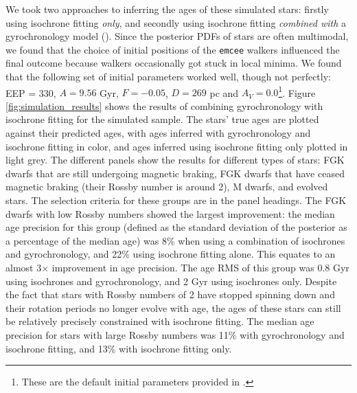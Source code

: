 We took two approaches to inferring the ages of these simulated stars:
firstly using isochrone fitting {\it only}, and secondly using isochrone
fitting {\it combined with} a gyrochronology model (\sd).
Since the posterior PDFs of stars are often multimodal, we found that the
choice of initial positions of the {\tt emcee} walkers influenced the final
outcome because walkers occasionally got stuck in local minima.
We found that the following set of initial parameters worked well, though not
perfectly: EEP = 330, $A = 9.56$ Gyr, $F = -0.05$, $D = 269$ pc and $A_V =
0.0$\footnote{These are the default initial parameters provided in \sd.}.
Figure \ref{fig:simulation_results} shows the results of combining
gyrochronology with isochrone fitting for the simulated sample.
The stars' true ages are plotted against their predicted ages, with ages
inferred with gyrochronology and isochrone fitting
in color, and ages inferred using isochrone fitting only plotted in light
grey.
The different panels show the results for different types of stars: FGK
dwarfs that are still undergoing magnetic braking, FGK dwarfs that have ceased
magnetic braking (their Rossby number is around 2), M dwarfs, and evolved
stars.
The selection criteria for these groups are in the panel headings.
The FGK dwarfs with low Rossby numbers showed the largest improvement: the
median age precision for this group (defined as the standard deviation of the
posterior as a percentage of the median age) was 8\% when using a combination
of isochrones and gyrochronology, and 22\% using isochrone fitting alone.
This equates to an almost 3$\times$ improvement in age precision.
The age RMS of this group was 0.8 Gyr using isochrones and gyrochronology, and
2 Gyr using isochrones only.
Despite the fact that stars with Rossby numbers of 2 have stopped spinning
down and their rotation periods no longer evolve with age, the ages of these
stars can still be relatively precisely constrained with isochrone fitting.
The median age precision for stars with large Rossby numbers was 11\% with
gyrochronology and isochrone fitting, and 13\% with isochrone fitting only.
